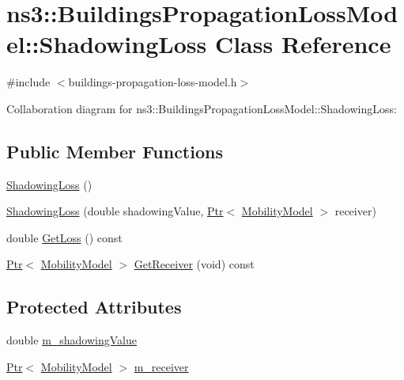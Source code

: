 \hypertarget{classns3_1_1BuildingsPropagationLossModel_1_1ShadowingLoss}{}\section{ns3\+:\+:Buildings\+Propagation\+Loss\+Model\+:\+:Shadowing\+Loss Class Reference}
\label{classns3_1_1BuildingsPropagationLossModel_1_1ShadowingLoss}


{\ttfamily \#include $<$buildings-\/propagation-\/loss-\/model.\+h$>$}



Collaboration diagram for ns3\+:\+:Buildings\+Propagation\+Loss\+Model\+:\+:Shadowing\+Loss\+:
\subsection*{Public Member Functions}
\begin{DoxyCompactItemize}
\item 
\hyperlink{classns3_1_1BuildingsPropagationLossModel_1_1ShadowingLoss_a1287a3c4389653dab244a75f1c3918ce}{Shadowing\+Loss} ()
\item 
\hyperlink{classns3_1_1BuildingsPropagationLossModel_1_1ShadowingLoss_a5654812dfabd1cd81b3a7bb43da09982}{Shadowing\+Loss} (double shadowing\+Value, \hyperlink{classns3_1_1Ptr}{Ptr}$<$ \hyperlink{classns3_1_1MobilityModel}{Mobility\+Model} $>$ receiver)
\item 
double \hyperlink{classns3_1_1BuildingsPropagationLossModel_1_1ShadowingLoss_ac75a548f4ff86e0ee584788584e86abd}{Get\+Loss} () const 
\item 
\hyperlink{classns3_1_1Ptr}{Ptr}$<$ \hyperlink{classns3_1_1MobilityModel}{Mobility\+Model} $>$ \hyperlink{classns3_1_1BuildingsPropagationLossModel_1_1ShadowingLoss_ab6cd1db43daa91ce5dbe167e353b9e54}{Get\+Receiver} (void) const 
\end{DoxyCompactItemize}
\subsection*{Protected Attributes}
\begin{DoxyCompactItemize}
\item 
double \hyperlink{classns3_1_1BuildingsPropagationLossModel_1_1ShadowingLoss_a1f9344d38080c2f779aed244bc415171}{m\+\_\+shadowing\+Value}
\item 
\hyperlink{classns3_1_1Ptr}{Ptr}$<$ \hyperlink{classns3_1_1MobilityModel}{Mobility\+Model} $>$ \hyperlink{classns3_1_1BuildingsPropagationLossModel_1_1ShadowingLoss_a58ff2046e17816941ea33223a6667ec6}{m\+\_\+receiver}
\end{DoxyCompactItemize}


